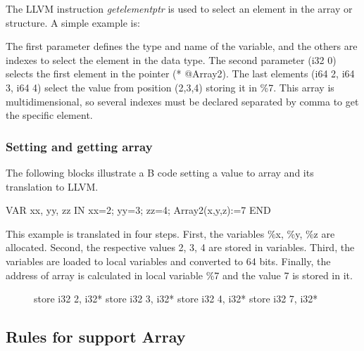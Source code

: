 The LLVM instruction \textit{getelementptr} is used to select an element in
the array or structure. A simple example is: 

\begin{llvmcode}
\end{llvmcode}


The first parameter defines the type and name of the variable, and the others are
indexes to select the element in the data type. The second parameter (i32 0)
selects the first element in the pointer (* @Array2). The last elements 
(i64 2, i64 3, i64 4) select the value from position (2,3,4) storing it in \%7.
This array is multidimensional, so several indexes must be declared separated
by comma to get the specific element.

\subsubsection{Setting and getting array}

The following blocks illustrate a B code setting a value to array
and its translation to LLVM. 

\begin{pascalcode} 
VAR xx, yy, zz IN
	xx=2;
	yy=3;
	zz=4;
	Array2(x,y,z):=7
END
\end{pascalcode}

This example is translated in four steps. First, the variables \%x, \%y, \%z 
are allocated. Second, the respective values 2, 3, 4 are stored in variables. 
Third, the variables are loaded to local variables and converted to 64 bits. 
Finally, the address of array is calculated in local variable \%7 and the value 
7 is stored in it.  
\begin{figure}[h]
\begin{llvmcode}
store i32 2, i32* %
store i32 3, i32* %
store i32 4, i32* %
store i32 7, i32* %
\end{llvmcode}
\end{figure}

\subsection{Rules for support Array}


